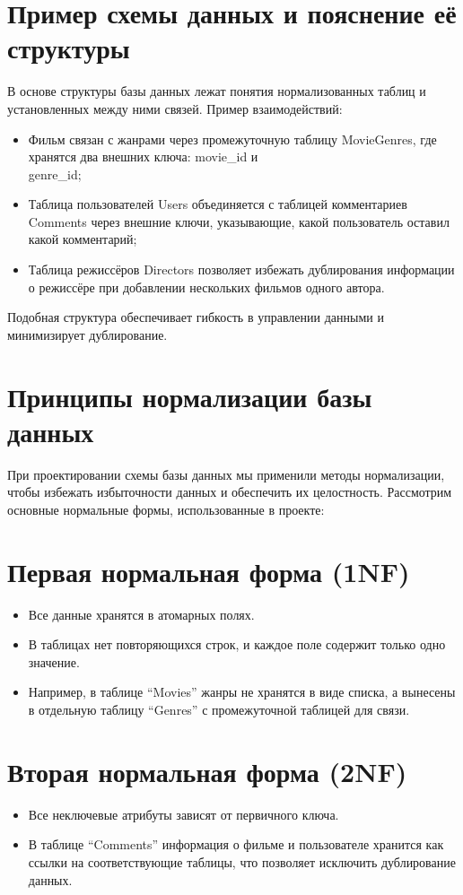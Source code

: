 \section{Пример схемы данных и пояснение её структуры}
В основе структуры базы данных лежат понятия нормализованных таблиц и установленных между ними связей. Пример взаимодействий:
\begin{itemize}
    \item Фильм связан с жанрами через промежуточную таблицу MovieGenres, где хранятся два внешних ключа: movie\_id и
    \\
    genre\_id;
    \item Таблица пользователей Users объединяется с таблицей комментариев Comments через внешние ключи, указывающие, какой пользователь оставил какой комментарий;
    \item Таблица режиссёров Directors позволяет избежать дублирования информации о режиссёре при добавлении нескольких фильмов одного автора.
\end{itemize}
Подобная структура обеспечивает гибкость в управлении данными и минимизирует дублирование.

\section{Принципы нормализации базы данных}
При проектировании схемы базы данных мы применили методы нормализации, чтобы избежать избыточности данных и обеспечить их целостность. Рассмотрим основные нормальные формы, использованные в проекте:

\section{Первая нормальная форма (1NF)}
\begin{itemize}
    \item Все данные хранятся в атомарных полях.
    \item В таблицах нет повторяющихся строк, и каждое поле содержит только одно значение.
    \item Например, в таблице ``Movies'' жанры не хранятся в виде списка, а вынесены в отдельную таблицу ``Genres'' с промежуточной таблицей для связи.
\end{itemize}

\section{Вторая нормальная форма (2NF)}
\begin{itemize}
    \item Все неключевые атрибуты зависят от первичного ключа.
    \item В таблице ``Comments'' информация о фильме и пользователе хранится как ссылки на соответствующие таблицы, что позволяет исключить дублирование данных.
\end{itemize}

